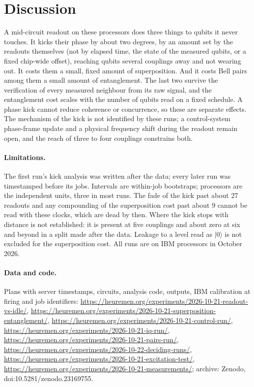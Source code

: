 \documentclass[reprint,amsmath,amssymb,aps,superscriptaddress,nofootinbib]{revtex4-2}
\begin{document}
\section{Discussion}

A mid-circuit readout on these processors does three things to qubits it never touches. It kicks their phase by about two degrees, by an amount set by the readouts themselves (not by elapsed time, the state of the measured qubits, or a fixed chip-wide offset), reaching qubits several couplings away and not wearing out. It costs them a small, fixed amount of superposition. And it costs Bell pairs among them a small amount of entanglement. The last two survive the verification of every measured neighbour from its raw signal, and the entanglement cost scales with the number of qubits read on a fixed schedule. A phase kick cannot reduce coherence or concurrence, so these are separate effects. The mechanism of the kick is not identified by these runs; a control-system phase-frame update and a physical frequency shift during the readout remain open, and the reach of three to four couplings constrains both.

\paragraph*{Limitations.} The first run's kick analysis was written after the data; every later run was timestamped before its jobs. Intervals are within-job bootstraps; processors are the independent units, three in most runs. The fade of the kick past about 27 readouts and any compounding of the superposition cost past about 9 cannot be read with these clocks, which are dead by then. Where the kick stops with distance is not established: it is present at five couplings and about zero at six and beyond in a split made after the data. Leakage to a level read as $|0\rangle$ is not excluded for the superposition cost. All runs are on IBM processors in October 2026.

\paragraph*{Data and code.} Plans with server timestamps, circuits, analysis code, outputs, IBM calibration at firing and job identifiers: \url{https://heuremen.org/experiments/2026-10-21-readout-vs-idle/}, \url{https://heuremen.org/experiments/2026-10-21-superposition-entanglement/}, \url{https://heuremen.org/experiments/2026-10-21-control-run/}, \url{https://heuremen.org/experiments/2026-10-21-iq-run/}, \url{https://heuremen.org/experiments/2026-10-21-pairs-run/}, \url{https://heuremen.org/experiments/2026-10-22-deciding-runs/}, \url{https://heuremen.org/experiments/2026-10-21-excitation-test/}, \url{https://heuremen.org/experiments/2026-10-21-measurements/}; archive: Zenodo, doi:10.5281/zenodo.23169755.
\end{document}
